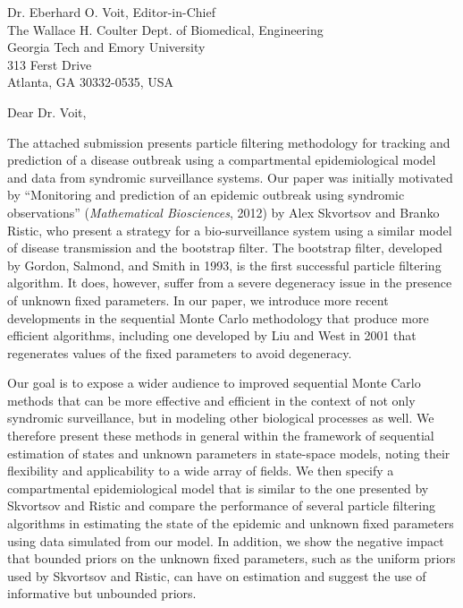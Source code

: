\documentclass{letter} %
\begin{document}
\signature{Daniel M. Sheinson, Jarad Niemi, and Wendy Meiring}           %
\longindentation=0pt                       %
\let\raggedleft\raggedright                %

\begin{letter}{Dr. Eberhard O. Voit, Editor-in-Chief \\
The Wallace H. Coulter Dept. of Biomedical, Engineering \\
Georgia Tech and Emory University \\
313 Ferst Drive \\
Atlanta, GA 30332-0535, USA
}

\opening{Dear Dr. Voit,}

\noindent The attached submission presents particle filtering methodology for tracking and prediction of a disease outbreak using a compartmental epidemiological model and data from syndromic surveillance systems. Our paper was initially motivated by ``Monitoring and prediction of an epidemic outbreak using syndromic observations'' (\emph{Mathematical Biosciences}, 2012) by Alex Skvortsov and Branko Ristic, who present a strategy for a bio-surveillance system using a similar model of disease transmission and the bootstrap filter. The bootstrap filter, developed by Gordon, Salmond, and Smith in 1993, is the first successful particle filtering algorithm. It does, however, suffer from a severe degeneracy issue in the presence of unknown fixed parameters. In our paper, we introduce more recent developments in the sequential Monte Carlo methodology that produce more efficient algorithms, including one developed by Liu and West in 2001 that regenerates values of the fixed parameters to avoid degeneracy.

Our goal is to expose a wider audience to improved sequential Monte Carlo methods that can be more effective and efficient in the context of not only syndromic surveillance, but in modeling other biological processes as well. We therefore present these methods in general within the framework of sequential estimation of states and unknown parameters in state-space models, noting their flexibility and applicability to a wide array of fields. We then specify a compartmental epidemiological model that is similar to the one presented by Skvortsov and Ristic and compare the performance of several particle filtering algorithms in estimating the state of the epidemic and unknown fixed parameters using data simulated from our model. In addition, we show the negative impact that bounded priors on the unknown fixed parameters, such as the uniform priors used by Skvortsov and Ristic, can have on estimation and suggest the use of informative but unbounded priors.


\end{letter}
\end{document}
